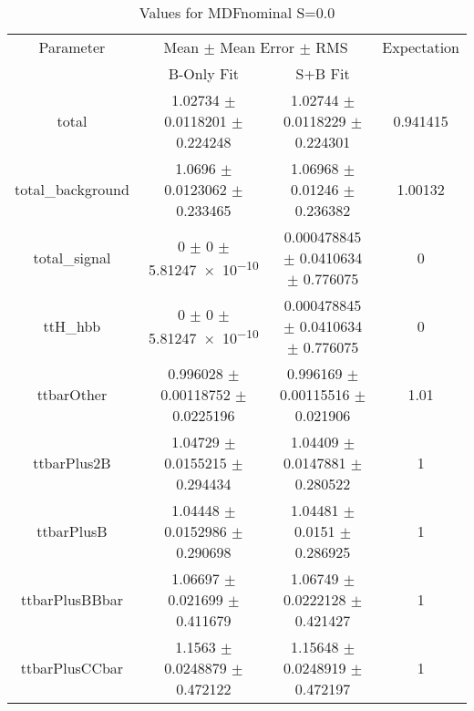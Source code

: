 \begin{table}
\centering
\caption{Values for MDFnominal S=0.0}
\begin{tabular}{cccc}
\toprule
Parameter & \multicolumn{2}{c}{Mean $\pm$ Mean Error $\pm$ RMS} & Expectation\\
 & B-Only Fit & S+B Fit & \\
\midrule
total & \num{1.02734} $\pm$ \num{0.0118201} $\pm$ \num{0.224248} & \num{1.02744} $\pm$ \num{0.0118229} $\pm$ \num{0.224301} & \num{0.941415}\\
total\_background & \num{1.0696} $\pm$ \num{0.0123062} $\pm$ \num{0.233465} & \num{1.06968} $\pm$ \num{0.01246} $\pm$ \num{0.236382} & \num{1.00132}\\
total\_signal & \num{0} $\pm$ \num{0} $\pm$ \num{5.81247e-10} & \num{0.000478845} $\pm$ \num{0.0410634} $\pm$ \num{0.776075} & \num{0}\\
ttH\_hbb & \num{0} $\pm$ \num{0} $\pm$ \num{5.81247e-10} & \num{0.000478845} $\pm$ \num{0.0410634} $\pm$ \num{0.776075} & \num{0}\\
ttbarOther & \num{0.996028} $\pm$ \num{0.00118752} $\pm$ \num{0.0225196} & \num{0.996169} $\pm$ \num{0.00115516} $\pm$ \num{0.021906} & \num{1.01}\\
ttbarPlus2B & \num{1.04729} $\pm$ \num{0.0155215} $\pm$ \num{0.294434} & \num{1.04409} $\pm$ \num{0.0147881} $\pm$ \num{0.280522} & \num{1}\\
ttbarPlusB & \num{1.04448} $\pm$ \num{0.0152986} $\pm$ \num{0.290698} & \num{1.04481} $\pm$ \num{0.0151} $\pm$ \num{0.286925} & \num{1}\\
ttbarPlusBBbar & \num{1.06697} $\pm$ \num{0.021699} $\pm$ \num{0.411679} & \num{1.06749} $\pm$ \num{0.0222128} $\pm$ \num{0.421427} & \num{1}\\
ttbarPlusCCbar & \num{1.1563} $\pm$ \num{0.0248879} $\pm$ \num{0.472122} & \num{1.15648} $\pm$ \num{0.0248919} $\pm$ \num{0.472197} & \num{1}\\
\bottomrule
\end{tabular}
\end{table}